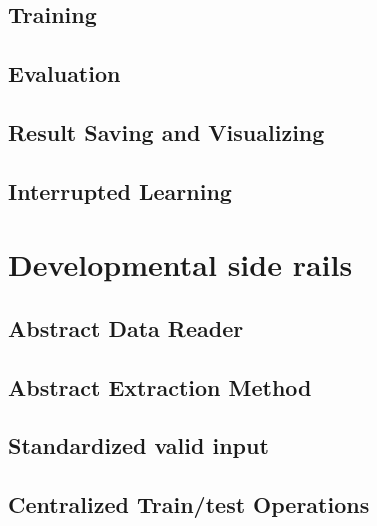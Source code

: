 \subsection{Training}

\subsection{Evaluation}

\subsection{Result Saving and Visualizing}

\subsection{Interrupted Learning}

\section{Developmental side rails}

\subsection{Abstract Data Reader}

\subsection{Abstract Extraction Method}

\subsection{Standardized valid input}

\subsection{Centralized Train/test Operations}